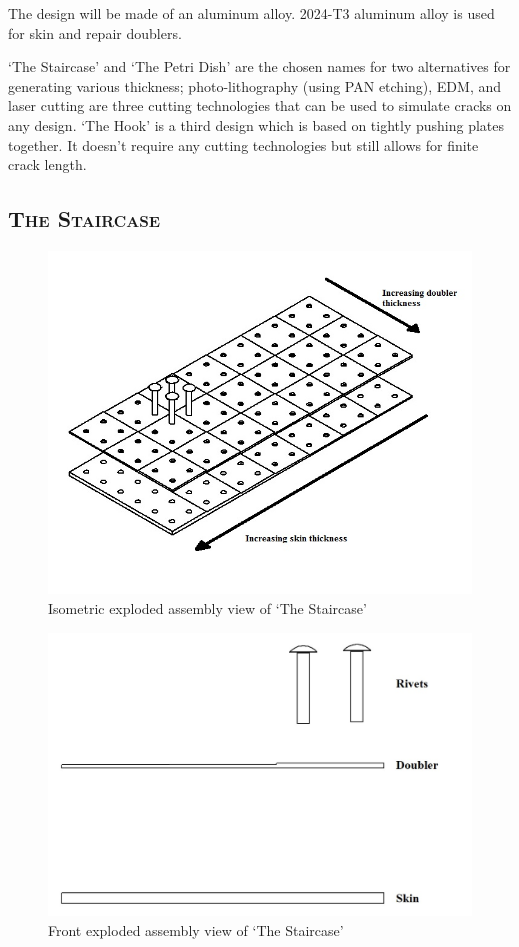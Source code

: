 \documentclass[12pt]{article}
\begin{document}
The design will be made of an aluminum alloy. 2024-T3 aluminum alloy is used for skin and repair doublers.

`The Staircase' and `The Petri Dish' are the chosen names for two alternatives for generating various thickness; photo-lithography (using PAN etching), EDM, and laser cutting are three cutting technologies that can be used to simulate cracks on any design. `The Hook' is a third design which is based on tightly pushing plates together. It doesn't require any cutting technologies but still allows for finite crack length. 

\subsection{\textsc{The Staircase} }

\begin{figure}[h!]
  \centering
  	\includegraphics[width=\textwidth]{Steps_iso}
  \caption{Isometric exploded assembly view of `The Staircase'}
  \label{fig:steps_iso}
\end{figure}

\begin{figure}[h!]
  \centering
  	\includegraphics[width=\textwidth]{Steps_front}
  \caption{Front exploded assembly view of `The Staircase'}
  \label{fig:steps_front}
\end{figure}
\end{document}
